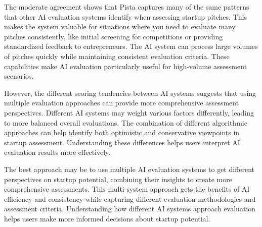The moderate agreement shows that Pista captures many of the same patterns that other AI evaluation systems identify when assessing startup pitches. This makes the system valuable for situations where you need to evaluate many pitches consistently, like initial screening for competitions or providing standardized feedback to entrepreneurs. The AI system can process large volumes of pitches quickly while maintaining consistent evaluation criteria. These capabilities make AI evaluation particularly useful for high-volume assessment scenarios.

However, the different scoring tendencies between AI systems suggests that using multiple evaluation approaches can provide more comprehensive assessment perspectives. Different AI systems may weight various factors differently, leading to more balanced overall evaluations. The combination of different algorithmic approaches can help identify both optimistic and conservative viewpoints in startup assessment. Understanding these differences helps users interpret AI evaluation results more effectively.

The best approach may be to use multiple AI evaluation systems to get different perspectives on startup potential, combining their insights to create more comprehensive assessments. This multi-system approach gets the benefits of AI efficiency and consistency while capturing different evaluation methodologies and assessment criteria. Understanding how different AI systems approach evaluation helps users make more informed decisions about startup potential.
